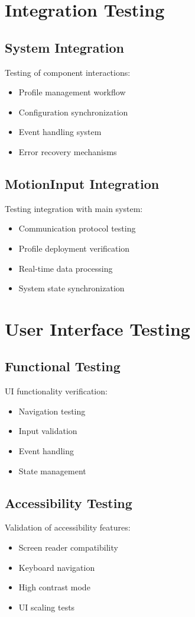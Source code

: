 \section{Integration Testing}
\subsection{System Integration}
Testing of component interactions:
\begin{itemize}
    \item Profile management workflow
    \item Configuration synchronization
    \item Event handling system
    \item Error recovery mechanisms
\end{itemize}

\subsection{MotionInput Integration}
Testing integration with main system:
\begin{itemize}
    \item Communication protocol testing
    \item Profile deployment verification
    \item Real-time data processing
    \item System state synchronization
\end{itemize}

\section{User Interface Testing}
\subsection{Functional Testing}
UI functionality verification:
\begin{itemize}
    \item Navigation testing
    \item Input validation
    \item Event handling
    \item State management
\end{itemize}

\subsection{Accessibility Testing}
Validation of accessibility features:
\begin{itemize}
    \item Screen reader compatibility
    \item Keyboard navigation
    \item High contrast mode
    \item UI scaling tests
\end{itemize}

